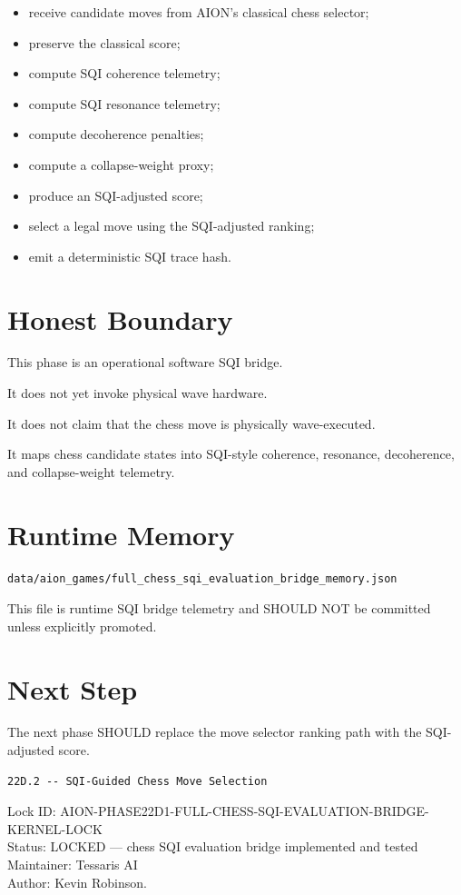 \documentclass[11pt,a4paper]{article}
\begin{document}
\begin{itemize}
  \item receive candidate moves from AION's classical chess selector;
  \item preserve the classical score;
  \item compute SQI coherence telemetry;
  \item compute SQI resonance telemetry;
  \item compute decoherence penalties;
  \item compute a collapse-weight proxy;
  \item produce an SQI-adjusted score;
  \item select a legal move using the SQI-adjusted ranking;
  \item emit a deterministic SQI trace hash.
\end{itemize}

\section{Honest Boundary}

This phase is an operational software SQI bridge.

It does not yet invoke physical wave hardware.

It does not claim that the chess move is physically wave-executed.

It maps chess candidate states into SQI-style coherence, resonance, decoherence, and collapse-weight telemetry.

\section{Runtime Memory}

\begin{verbatim}
data/aion_games/full_chess_sqi_evaluation_bridge_memory.json
\end{verbatim}

This file is runtime SQI bridge telemetry and SHOULD NOT be committed unless explicitly promoted.

\section{Next Step}

The next phase SHOULD replace the move selector ranking path with the SQI-adjusted score.

\begin{verbatim}
22D.2 -- SQI-Guided Chess Move Selection
\end{verbatim}

\bigskip

\noindent
Lock ID: AION-PHASE22D1-FULL-CHESS-SQI-EVALUATION-BRIDGE-KERNEL-LOCK\\
Status: LOCKED --- chess SQI evaluation bridge implemented and tested\\
Maintainer: Tessaris AI\\
Author: Kevin Robinson.
\end{document}
